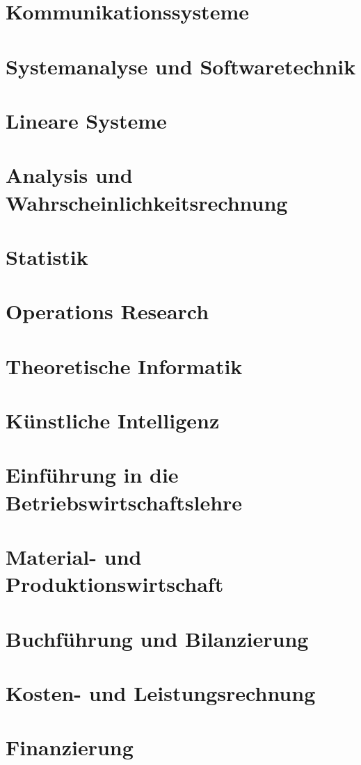\documentclass{hswbook}
\begin{document}
    \chapter{Kommunikationssysteme}
    \chapter{Systemanalyse und Softwaretechnik}
    \chapter{Lineare Systeme}
    \chapter{Analysis und Wahrscheinlichkeitsrechnung}
    \chapter{Statistik}
    \chapter{Operations Research}
    \chapter{Theoretische Informatik}
    \chapter{Künstliche Intelligenz}
    \chapter{Einführung in die Betriebswirtschaftslehre}
    \chapter{Material- und Produktionswirtschaft}
    \chapter{Buchführung und Bilanzierung}
    \chapter{Kosten- und Leistungsrechnung}
    \chapter{Finanzierung}
\end{document}
